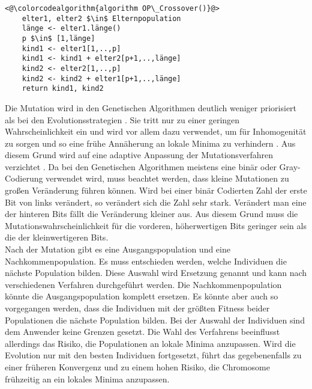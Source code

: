 \begin{lstlisting}[caption={One-Point-Crossover}, firstnumber=1, captionpos=b,label=lst:crossover]
<@\colorcodealgorithm{algorithm OP\_Crossover()}@>
	elter1, elter2 $\in$ Elternpopulation
	länge <- elter1.länge()
	p $\in$ [1,länge]
	kind1 <- elter1[1,..,p]
	kind1 <- kind1 + elter2[p+1,..,länge]
	kind2 <- elter2[1,..,p]
	kind2 <- kind2 + elter1[p+1,..,länge]
	return kind1, kind2
\end{lstlisting}
Die Mutation wird in den Genetischen Algorithmen deutlich weniger priorisiert als bei den Evolutionsstrategien \cite[S. 200]{schoeneburg}. Sie tritt nur zu einer geringen Wahrscheinlichkeit ein und wird vor allem dazu verwendet, um für Inhomogenität zu sorgen und so eine frühe Annäherung an lokale Minima zu verhindern \cite[S. 200]{schoeneburg}.
Aus diesem Grund wird auf eine adaptive Anpassung der Mutationsverfahren verzichtet \cite[S. 200]{schoeneburg}. Da bei den Genetischen Algorithmen meistens eine binär oder Gray-Codierung verwendet wird, muss beachtet werden, dass kleine Mutationen zu großen Veränderung führen können.
Wird bei einer binär Codierten Zahl der erste Bit von links verändert, so verändert sich die Zahl sehr stark. Verändert man eine der hinteren Bits fällt die Veränderung kleiner aus. Aus diesem Grund muss die Mutationswahrscheinlichkeit für die vorderen, höherwertigen Bits geringer sein als die der kleinwertigeren Bits.\\
Nach der Mutation gibt es eine Ausgangspopulation und eine Nachkommenpopulation. Es muss entschieden werden, welche Individuen die nächste Population bilden. Diese Auswahl wird Ersetzung genannt und kann nach verschiedenen Verfahren durchgeführt werden.
Die Nachkommenpopulation könnte die Ausgangspopulation komplett ersetzen. Es könnte aber auch so vorgegangen werden, dass die Individuen mit der größten Fitness beider Populationen die nächste Population bilden. Bei der Auswahl der Individuen sind dem Anwender keine Grenzen gesetzt. Die Wahl des Verfahrens beeinflusst allerdings das Risiko, die Populationen an lokale Minima anzupassen. Wird die Evolution nur mit den besten Individuen fortgesetzt, führt das gegebenenfalls zu einer früheren Konvergenz und zu einem hohen Risiko, die Chromosome frühzeitig an ein lokales Minima anzupassen. 

